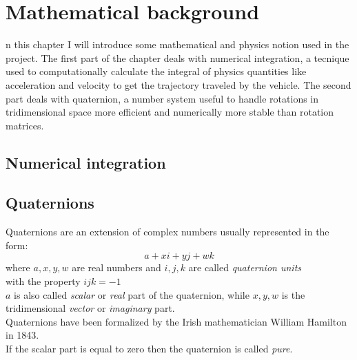 \chapter{Mathematical background}
\label{chap:math_background}

n this chapter I will introduce some mathematical and physics notion used in the project.
The first part of the chapter deals with numerical integration, a tecnique used to computationally calculate the integral of physics quantities like acceleration and velocity to get the trajectory traveled by the vehicle.
The second part deals with quaternion, a number system useful to handle rotations in tridimensional space more efficient and numerically more stable than rotation matrices.

\section{Numerical integration}

\section{Quaternions}
Quaternions are an extension of complex numbers usually represented in the form:
$$ a + xi + yj + wk $$
where $a, x, y, w$ are real numbers and $i, j, k$ are called \textit{quaternion units} \\
with the property ${ijk=-1}$  \\
$a$ is also called \textit{scalar} or \textit{real} part of the quaternion, while $x,y,w$ is the tridimensional \textit{vector} or \textit{imaginary} part. \cite{amslaurea6701} \\
Quaternions have been formalized by the Irish mathematician William Hamilton in 1843. \\
If the scalar part is equal to zero then the quaternion is called \textit{pure}.

